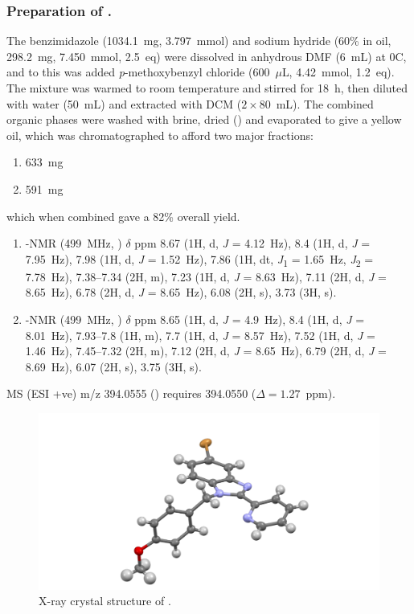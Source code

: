 \begin{refsection}
\subsubsection{Preparation of .}
The benzimidazole  (1034.1~mg, 3.797~mmol) and sodium hydride (60\% in oil, 298.2~mg, 7.450~mmol, 2.5~eq) were dissolved in anhydrous DMF (6~mL) at 0\degree{}C, and to this was added \textit{p}-methoxybenzyl chloride (600~$\mu$L, 4.42~mmol, 1.2~eq).
The mixture was warmed to room temperature and stirred for 18~h, then diluted with water (50~mL) and extracted with DCM ($2\times80$~mL).
The combined organic phases were washed with brine, dried () and evaporated to give a yellow oil, which was chromatographed to afford two major fractions:
\begin{enumerate}
    \item 633~mg
    \item 591~mg
\end{enumerate}
which when combined gave a 82\% overall yield.

\begin{enumerate}
    \item {}-NMR (499~MHz, ) $\delta$ ppm 8.67 (1H, d, \emph{J} = 4.12~Hz), 8.4 (1H, d, \emph{J} = 7.95~Hz), 7.98 (1H, d, \emph{J} = 1.52~Hz), 7.86 (1H, dt, \emph{J}\textsubscript{1} = 1.65~Hz, \emph{J}\textsubscript{2} = 7.78~Hz), 7.38--7.34 (2H, m), 7.23 (1H, d, \emph{J} = 8.63~Hz), 7.11 (2H, d, \emph{J} = 8.65~Hz), 6.78 (2H, d, \emph{J} = 8.65~Hz), 6.08 (2H, s), 3.73 (3H, s).
    \item {}-NMR (499~MHz, ) $\delta$ ppm 8.65 (1H, d, \textit{J} = 4.9~Hz), 8.4 (1H, d, \textit{J} = 8.01~Hz), 7.93--7.8 (1H, m), 7.7 (1H, d, \textit{J} = 8.57~Hz), 7.52 (1H, d, \textit{J} = 1.46~Hz), 7.45--7.32 (2H, m), 7.12 (2H, d, \textit{J} = 8.65~Hz), 6.79 (2H, d, \textit{J} = 8.69~Hz), 6.07 (2H, s), 3.75 (3H, s).
\end{enumerate}
MS (ESI +ve) m/z 394.0555 ()  requires 394.0550 ($\Delta=1.27$~ppm).

\begin{figure}
    \includegraphics[width=0.8\linewidth]{Figures/rhs-bromo-2py-pmb-xtal.pdf}
    \caption{X-ray crystal structure of .}
\end{figure}


\end{refsection}
